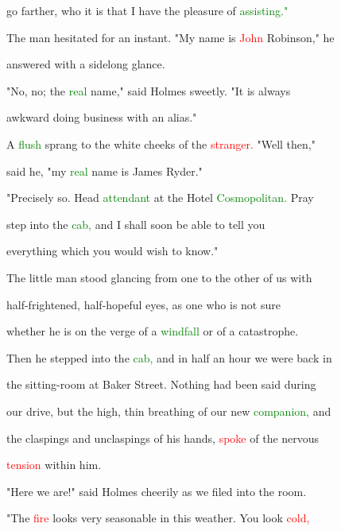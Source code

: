  go farther, who it is that I have the pleasure of \textcolor{green}{assisting."}



 The man hesitated for an instant. "My name is \textcolor{red}{John} Robinson," he

 answered with a sidelong glance.



 "No, no; the \textcolor{green}{real} name," said Holmes sweetly. "It is always

 awkward doing business with an alias."



 A \textcolor{green}{flush} sprang to the \textcolor{BurntOrange}{white} cheeks of the \textcolor{red}{stranger.} "Well then,"

 said he, "my \textcolor{green}{real} name is James Ryder."



 "Precisely so. Head \textcolor{green}{attendant} at the Hotel \textcolor{green}{Cosmopolitan.} \textcolor{BurntOrange}{Pray}

 step into the \textcolor{green}{cab,} and I shall soon be able to tell you

 everything which you would wish to know."



 The little man stood glancing from one to the other of us with

 half-frightened, half-hopeful eyes, as one who is not sure

 whether he is on the \textcolor{BurntOrange}{verge} of a \textcolor{green}{windfall} or of a \textcolor{BurntOrange}{catastrophe.}

 Then he stepped into the \textcolor{green}{cab,} and in half an hour we were back in

 the sitting-room at Baker Street. Nothing had been said during

 our drive, but the high, thin breathing of our new \textcolor{green}{companion,} and

 the claspings and unclaspings of his hands, \textcolor{red}{spoke} of the \textcolor{BurntOrange}{nervous}

 \textcolor{red}{tension} within him.



 "Here we are!" said Holmes cheerily as we filed into the room.

 "The \textcolor{red}{fire} looks very seasonable in this weather. You look \textcolor{red}{cold,}

